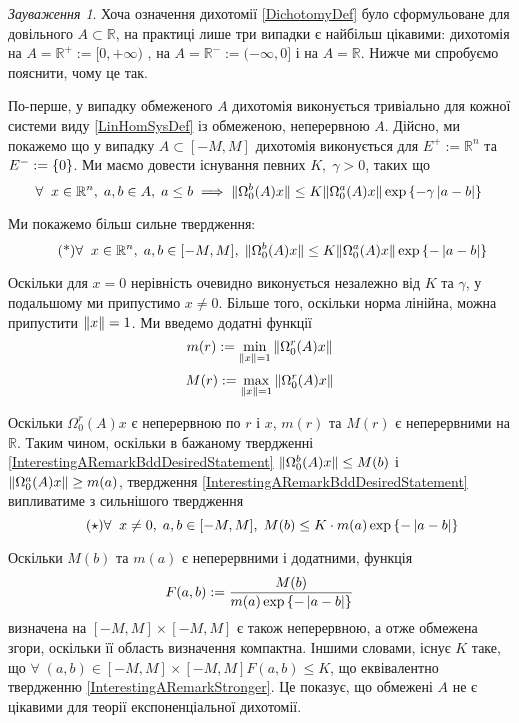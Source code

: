 \documentclass[14pt]{extarticle} %
\let\oldforall\forall
\renewcommand{\forall}{\oldforall\;}
\theoremstyle{remark}
\newtheorem{remark}{Зауваження}
\begin{document}
\begin{remark}
	Хоча означення дихотомії \ref{DichotomyDef} було сформульоване для довільного $A\subset\mathbb{R}$, на практиці лише три випадки є 
	найбільш цікавими: дихотомія на $A=\mathbb{R}^+:=[0,+\infty)$
	, на $A=\mathbb{R}^-:=(-\infty,0]$ і на $A=\mathbb{R}$. Нижче ми спробуємо пояснити, чому це так.

	По-перше, у випадку обмеженого $A$ дихотомія виконується тривіально для кожної системи виду \ref{LinHomSysDef} із обмеженою, неперервною
	$A$. Дійсно, ми покажемо що у випадку $A\subset[-M,M]$ дихотомія виконується для $E^+:=\mathbb{R}^n$ та $E^-:=\left\{0\right\}$. Ми маємо
	довести існування певних $K,\;\gamma>0$, таких що
	\[\forall x\in\mathbb{R}^n,\;a,b\in A,\;a\leq b\implies 
	\mynorm{\Omega^b_0(A){x}}\leq K\mynorm{\Omega_0^a(A){x}}\exp\left\{-\gamma\myabs{a-b}\right\}\\
	\]

	Ми покажемо більш сильне твердження:
	\[\tag{*}\label{InterestingARemarkBddDesiredStatement}
	\forall x\in\mathbb{R}^n,\;a,b\in [-M,M],\;
	\mynorm{\Omega^b_0(A){x}}\leq K\mynorm{\Omega_0^a(A){x}}\exp\left\{-\myabs{a-b}\right\}\\
	\]
	
	Оскільки для $x=0$ нерівність очевидно виконується незалежно від $K$ та $\gamma$, у подальшому ми припустимо $x\neq 0$. Більше того,
	оскільки норма лінійна, можна припустити $\|x\|=1$. Ми введемо додатні функції
	\[m(r):=\min_{\mynorm{x}=1}\mynorm{\Omega^r_0(A)x}\]
	\[M(r):=\max_{\mynorm{x}=1}\mynorm{\Omega^r_0(A)x}\]
	
	Оскільки $\Omega_0^r(A)x$ є неперервною по $r$ і $x$, $m(r)$ та $M(r)$ є неперервними на $\mathbb{R}$. Таким чином, оскільки в 
	бажаному твердженні \ref{InterestingARemarkBddDesiredStatement} $\|\Omega^b_0(A)x\|\leq M(b)$ і $\|\Omega^a_0(A)x\|
	\geq m(a)$, твердження \ref{InterestingARemarkBddDesiredStatement} випливатиме з сильнішого твердження
	\[\tag{$\star$}\label{InterestingARemarkStronger}
	\forall x\neq 0,\;a,b\in [-M,M],\;
	M(b)\leq K\cdot m(a)\exp\left\{-\myabs{a-b}\right\}\\
	\]

	Оскільки $M(b)$ та $m(a)$ є неперервними і додатними, функція 
	\[F(a,b):=\frac{M(b)}{m(a)\exp\left\{-\left|a-b\right|\right\}}\]
	визначена на $[-M,M]\times[-M,M]$ є також неперервною, а отже обмежена згори, оскільки її область визначення компактна. Іншими словами,
	існує $K$ таке, що $\forall (a,b)\in[-M,M]\times[-M,M] F(a,b)\leq K$, що еквівалентно твердженню
	\ref{InterestingARemarkStronger}. Це показує, що обмежені $A$ не є цікавими для теорії експоненціальної дихотомії.


\end{remark}
\end{document}
